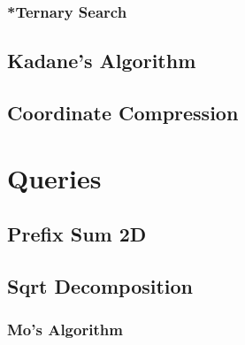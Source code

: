 \documentclass[letterpaper,landscape]{article}
\begin{document}
\subsubsection{*Ternary Search}

\subsection{Kadane's Algorithm}



\subsection{Coordinate Compression}



\section{Queries}

\subsection{Prefix Sum 2D}



\subsection{Sqrt Decomposition}

\subsubsection{Mo's Algorithm}

\end{document}
